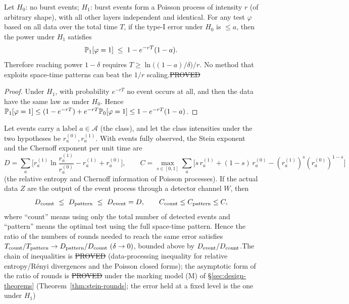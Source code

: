 \begin{proposition}\label{prop:poisson}
Let $H_0$: no burst events; $H_1$: burst events form a Poisson process of intensity $r$ (of arbitrary shape), with all other layers independent and identical.
For any test $\varphi$ based on all data over the total time $T$, if the type-I error under $H_0$ is $\le a$, then the power under $H_1$ satisfies
\[
\mathbb{P}_1[\varphi=1]\;\le\;1-e^{-rT}(1-a).
\]
Therefore reaching power $1-\delta$ requires $T\ge\ln\!\big((1-a)/\delta\big)/r$. No method that exploits space-time patterns can beat the $1/r$ scaling.\hfill\st{PROVED}
\end{proposition}
\begin{proof}
Under $H_1$, with probability $e^{-rT}$ no event occurs at all, and then the data have the same law as under $H_0$. Hence
$\mathbb{P}_1[\varphi=1]\le(1-e^{-rT})+e^{-rT}\mathbb{P}_0[\varphi=1]\le1-e^{-rT}(1-a)$.
\end{proof}

\begin{proposition}\label{prop:exponents}
Let events carry a label $a\in\mathcal A$ (the class), and let the class intensities under the two hypotheses be $r_a^{(0)},r_a^{(1)}$. With events fully observed,
the Stein exponent and the Chernoff exponent per unit time are
\[
D=\sum_a\Big[r^{(1)}_a\ln\frac{r^{(1)}_a}{r^{(0)}_a}-r^{(1)}_a+r^{(0)}_a\Big],\qquad
C=\max_{s\in[0,1]}\sum_a\Big[s\,r^{(1)}_a+(1-s)\,r^{(0)}_a-(r^{(1)}_a)^s(r^{(0)}_a)^{1-s}\Big]
\]
(the relative entropy and Chernoff information of Poisson processes). If the actual data $Z$ are the output of the event process through a detector channel $W$, then
\[
D_{\rm count}\ \le\ D_{\rm pattern}\ \le\ D_{\rm event}=D,\qquad C_{\rm count}\le C_{\rm pattern}\le C,
\]
where ``count'' means using only the total number of detected events and ``pattern'' means the optimal test using the full space-time pattern. Hence the ratio of the numbers of rounds needed to reach the same error satisfies
$T_{\rm count}/T_{\rm pattern}\to D_{\rm pattern}/D_{\rm count}\ (\delta\to0)$, bounded above by
$D_{\rm event}/D_{\rm count}$.\hfill The chain of inequalities is \st{PROVED} (data-processing inequality for relative entropy/R\'enyi divergences and the Poisson closed forms); the asymptotic form of the ratio of rounds is \st{PROVED} under the marking model (M) of \S\ref{sec:design-theorems} (Theorem~\ref{thm:stein-rounds}; the error held at a fixed level is the one under $H_1$)
\end{proposition}

